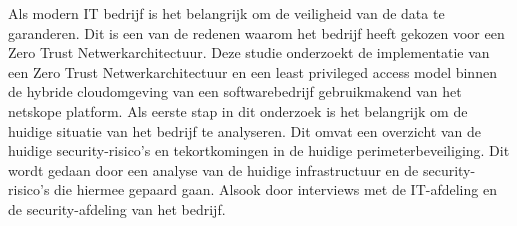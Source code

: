 




Als modern IT bedrijf is het belangrijk om de veiligheid van de data te garanderen. Dit is een van de redenen waarom het bedrijf heeft gekozen voor een Zero Trust Netwerkarchitectuur. 
Deze studie onderzoekt de implementatie van een Zero Trust Netwerkarchitectuur en een least privileged access model binnen de hybride cloudomgeving van een softwarebedrijf gebruikmakend van het netskope platform.
Als eerste stap in dit onderzoek is het belangrijk om de huidige situatie van het bedrijf te analyseren. Dit omvat een overzicht van de huidige security-risico’s en tekortkomingen in de huidige perimeterbeveiliging.
Dit wordt gedaan door een analyse van de huidige infrastructuur en de security-risico’s die hiermee gepaard gaan. Alsook door interviews met de IT-afdeling en de security-afdeling van het bedrijf.

